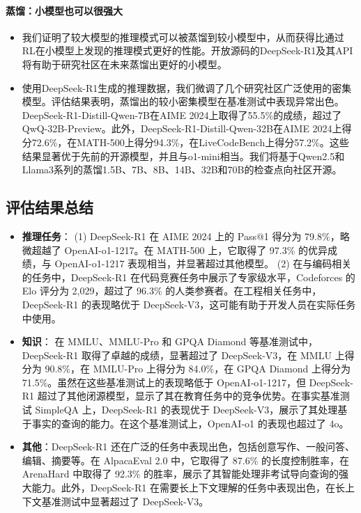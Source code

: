 \documentclass[11pt, a4paper, logo, copyright, nonumbering]{deepseek}
\newcommand{\dsri}{DeepSeek-R1}
\begin{document}
\paragraph{蒸馏：小模型也可以很强大}
\begin{itemize}[topsep=0pt]
    \item 我们证明了较大模型的推理模式可以被蒸馏到较小模型中，从而获得比通过RL在小模型上发现的推理模式更好的性能。开放源码的\dsri{}及其API将有助于研究社区在未来蒸馏出更好的小模型。
    \item 使用\dsri{}生成的推理数据，我们微调了几个研究社区广泛使用的密集模型。评估结果表明，蒸馏出的较小密集模型在基准测试中表现异常出色。DeepSeek-R1-Distill-Qwen-7B在AIME 2024上取得了55.5\%的成绩，超过了QwQ-32B-Preview。此外，DeepSeek-R1-Distill-Qwen-32B在AIME 2024上得分72.6\%，在MATH-500上得分94.3\%，在LiveCodeBench上得分57.2\%。这些结果显著优于先前的开源模型，并且与o1-mini相当。我们将基于Qwen2.5和Llama3系列的蒸馏1.5B、7B、8B、14B、32B和70B的检查点向社区开源。
\end{itemize}
\subsection{评估结果总结}
\begin{itemize}[topsep=0pt]

    \item \textbf{推理任务}：
    (1)
    \dsri{} 在 AIME 2024 上的 Pass@1 得分为 79.8\%，略微超越了 OpenAI-o1-1217。在 MATH-500 上，它取得了 97.3\% 的优异成绩，与 OpenAI-o1-1217 表现相当，并显著超过其他模型。
    (2)
    在与编码相关的任务中，\dsri{} 在代码竞赛任务中展示了专家级水平，Codeforces 的 Elo 评分为 2,029，超过了 96.3\% 的人类参赛者。在工程相关任务中，\dsri{} 的表现略优于 DeepSeek-V3，这可能有助于开发人员在实际任务中使用。

    \item \textbf{知识}：
    在 MMLU、MMLU-Pro 和 GPQA Diamond 等基准测试中，\dsri{} 取得了卓越的成绩，显著超过了 DeepSeek-V3，在 MMLU 上得分为 90.8\%，在 MMLU-Pro 上得分为 84.0\%，在 GPQA Diamond 上得分为 71.5\%。虽然在这些基准测试上的表现略低于 OpenAI-o1-1217，但 \dsri{} 超过了其他闭源模型，显示了其在教育任务中的竞争优势。在事实基准测试 SimpleQA 上，\dsri{} 的表现优于 DeepSeek-V3，展示了其处理基于事实的查询的能力。在这个基准测试上，OpenAI-o1 的表现也超过了 4o。
    \item \textbf{其他}：\dsri{} 还在广泛的任务中表现出色，包括创意写作、一般问答、编辑、摘要等。在 AlpacaEval 2.0 中，它取得了 87.6\% 的长度控制胜率，在 ArenaHard 中取得了 92.3\% 的胜率，展示了其智能处理非考试导向查询的强大能力。此外，\dsri{} 在需要长上下文理解的任务中表现出色，在长上下文基准测试中显著超过了 DeepSeek-V3。
\end{itemize}
\end{document}

